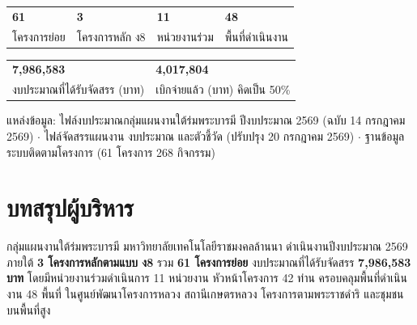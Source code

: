 \documentclass[12pt,a4paper]{article}
\begin{document}
\begin{titlepage}
\begin{center}
\setlength{\tabcolsep}{10pt}\renewcommand{\arraystretch}{1.5}
\begin{tabular}{>{\centering\arraybackslash}p{3.1cm}>{\centering\arraybackslash}p{3.1cm}>{\centering\arraybackslash}p{3.1cm}>{\centering\arraybackslash}p{3.1cm}}
\rowcolor{rpfnavy!8}
{\color{rpfnavy}\Large\bfseries 61} & {\color{rpfnavy}\Large\bfseries 3} & {\color{rpfnavy}\Large\bfseries 11} & {\color{rpfnavy}\Large\bfseries 48}\\
\rowcolor{rpfnavy!8}
{\footnotesize โครงการย่อย} & {\footnotesize โครงการหลัก ง8} & {\footnotesize หน่วยงานร่วม} & {\footnotesize พื้นที่ดำเนินงาน}\\
\end{tabular}
\par\vspace{16pt}
\setlength{\tabcolsep}{12pt}
\begin{tabular}{>{\centering\arraybackslash}p{5.1cm}>{\centering\arraybackslash}p{5.1cm}}
\rowcolor{rpfgold!12}
{\color{rpfnavy}\Large\bfseries 7,986,583} & {\color{rpfnavy}\Large\bfseries 4,017,804}\\
\rowcolor{rpfgold!12}
{\footnotesize งบประมาณที่ได้รับจัดสรร (บาท)} & {\footnotesize เบิกจ่ายแล้ว (บาท) คิดเป็น 50\%}\\
\end{tabular}
\end{center}
\vfill
{\footnotesize\color{rpfink}
แหล่งข้อมูล: ไฟล์งบประมาณกลุ่มแผนงานใต้ร่มพระบารมี ปีงบประมาณ 2569 (ฉบับ 14 กรกฎาคม 2569) $\cdot$
ไฟล์จัดสรรแผนงาน งบประมาณ และตัวชี้วัด (ปรับปรุง 20 กรกฎาคม 2569) $\cdot$
ฐานข้อมูลระบบติดตามโครงการ (61 โครงการ 268 กิจกรรม)}
\end{titlepage}

\tableofcontents
\clearpage

\section{บทสรุปผู้บริหาร}

กลุ่มแผนงานใต้ร่มพระบารมี มหาวิทยาลัยเทคโนโลยีราชมงคลล้านนา ดำเนินงานปีงบประมาณ 2569 ภายใต้
\textbf{3 โครงการหลักตามแบบ ง8} รวม \textbf{61 โครงการย่อย} งบประมาณที่ได้รับจัดสรร \textbf{7,986,583 บาท}
โดยมีหน่วยงานร่วมดำเนินการ 11 หน่วยงาน หัวหน้าโครงการ 42 ท่าน ครอบคลุมพื้นที่ดำเนินงาน 48 พื้นที่
ในศูนย์พัฒนาโครงการหลวง สถานีเกษตรหลวง โครงการตามพระราชดำริ และชุมชนบนพื้นที่สูง
\end{document}

